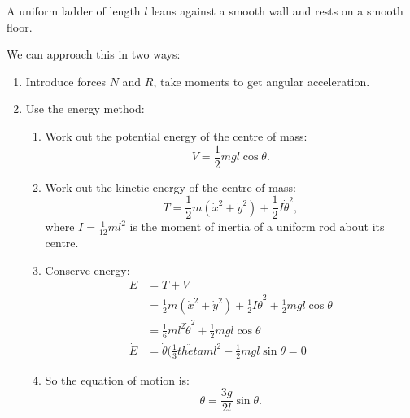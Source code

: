 \documentclass[a4paper]{article}
\begin{document}
\begin{eg}
  A uniform ladder of length $l$ leans against a smooth wall and rests on a smooth floor.
  
  \begin{center}
  \end{center}
  We can approach this in two ways:

  \begin{enumerate}
  \item Introduce forces $N$ and $R$, take moments to get angular acceleration.
  \item Use the energy method:
    \begin{enumerate}
    \item Work out the potential energy of the centre of mass: $$V = \frac{1}{2}mgl\cos\theta.$$
    \item Work out the kinetic energy of the centre of mass: $$T = \frac{1}{2}m(\dot{x}^2 + \dot{y}^2) + \frac{1}{2}I\dot{\theta}^2,$$ where $I=\frac{1}{12}ml^2$ is the moment of inertia of a uniform rod about its centre.
    \item Conserve energy:
      \begin{align*}
        E &= T + V \\
          &= \frac{1}{2}m(\dot{x}^2 + \dot{y}^2) + \frac{1}{2}I\dot{\theta}^2 + \frac{1}{2}mgl\cos\theta \\
          &= \frac{1}{6}ml^2\dot{\theta}^2 + \frac{1}{2}mgl\cos\theta \\
        \dot{E} &= \dot{\theta}(\frac{1}{3}\ddot{theta}ml^2 - \frac{1}{2}mgl\sin\theta = 0
      \end{align*}
    \item So the equation of motion is:
      $$\ddot{\theta} = \frac{3g}{2l}\sin\theta.$$
    \end{enumerate}
  \end{enumerate}
\end{eg}
\end{document}
